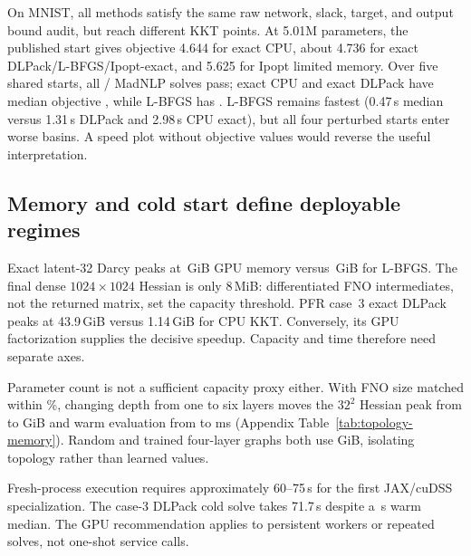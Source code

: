 On MNIST, all methods satisfy the same raw network, slack, target, and output
bound audit, but reach different KKT points.  At 5.01M parameters, the
published start gives objective 4.644 for exact CPU, about 4.736 for exact
DLPack/L-BFGS/Ipopt-exact, and 5.625 for Ipopt limited memory.  Over five shared
starts, all \MNISTSolved/\MNISTTotal{} MadNLP solves pass; exact CPU and exact
DLPack have median objective \MNISTExactMedianObjective, while L-BFGS has
\MNISTLBFGSMedianObjective.  L-BFGS remains fastest (0.47\,s median versus
1.31\,s DLPack and 2.98\,s CPU exact), but all four perturbed starts enter
worse basins.  A speed plot without objective values would reverse the useful
interpretation.

\subsection{Memory and cold start define deployable regimes}

Exact latent-32 Darcy peaks at \DarcyExactMemory\,GiB GPU memory versus
\DarcyLBFGSMemory\,GiB for L-BFGS.  The final dense
$1024\times1024$ Hessian is only 8\,MiB: differentiated FNO intermediates, not
the returned matrix, set the capacity threshold.  PFR case~3 exact DLPack
peaks at 43.9\,GiB versus 1.14\,GiB for CPU KKT.  Conversely, its GPU
factorization supplies the decisive speedup.  Capacity and time therefore need
separate axes.

Parameter count is not a sufficient capacity proxy either.  With FNO size
matched within \FNOShapeMaxParameterMismatch\%, changing depth from one to six
layers moves the $32^2$ Hessian peak from \FNOShapeMinMemory{} to
\FNOShapeMaxMemory{} GiB and warm evaluation from \FNOShapeFastHessian{} to
\FNOShapeSlowHessian{} ms (Appendix Table~\ref{tab:topology-memory}).  Random
and trained four-layer graphs both use \FNOShapeTrainedMemory{} GiB, isolating
topology rather than learned values.

Fresh-process execution requires approximately 60--75\,s for the first JAX/cuDSS
specialization.  The case-3 DLPack cold solve takes 71.7\,s despite a
\PFRCaseThreeGPU\,s warm median.  The GPU recommendation applies to persistent
workers or repeated solves, not one-shot service calls.
